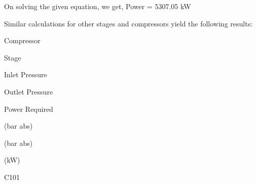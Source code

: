 \documentclass[a4paper,portrait,12pt]{article}
\begin{document}
\begin{flushleft}
On solving the given equation, we get, Power = 5307.05 kW
\end{flushleft}


\begin{flushleft}
Similar calculations for other stages and compressors yield the following results:
\end{flushleft}





\begin{flushleft}
Compressor
\end{flushleft}





\begin{flushleft}
Stage
\end{flushleft}





\begin{flushleft}
Inlet Pressure
\end{flushleft}





\begin{flushleft}
Outlet Pressure
\end{flushleft}





\begin{flushleft}
Power Required
\end{flushleft}





\begin{flushleft}
(bar abs)
\end{flushleft}





\begin{flushleft}
(bar abs)
\end{flushleft}





\begin{flushleft}
(kW)
\end{flushleft}





\begin{flushleft}
C101
\end{flushleft}
\end{document}
